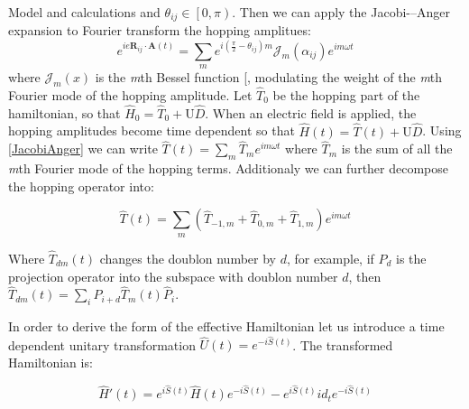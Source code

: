 \documentclass[aps,prl,twocolumn,amsmath,amssymb,superscriptaddress,nobibnotes]{revtex4-1}%
\renewcommand{\cite}[1]{{[}\onlinecite{#1}{]}}
\newcommand{\bs}{\boldsymbol}
\begin{document}
\begin{section}{Model and calculations}
and $\theta_{ij} \in \left[0,\pi\right)$. Then we can apply the Jacobi-–Anger expansion to Fourier transform the hopping amplitues:
\begin{equation}
\label{JacobiAnger}
e^{ie\bs{R}_{ij}\cdot\bs{A}(t)} = \sum_m e^{i(\frac{\pi}{2}-\theta_{ij})m} \mathcal{J}_m(\alpha_{ij}) e^{im\omega t} 
\end{equation}
where $\mathcal{J}_m(x)$ is the \textit{m}th Bessel function \cite{Kitamura2017}, modulating the weight of the \textit{m}th Fourier mode of the hopping amplitude. Let $\hat{T}_0$ be the hopping part of the hamiltonian, so that $\hat{H}_0 = \hat{T}_0 + \text{U}\hat{D}$. When an electric field is applied, the hopping amplitudes become time dependent so that $\hat{H}(t) = \hat{T}(t) +  \text{U}\hat{D}$. Using \ref{JacobiAnger} we can write $\hat{T}(t) = \sum_m \hat{T}_m e^{im \omega t}$ where $\hat{T}_m$ is the sum of all the \textit{m}th Fourier mode of the hopping terms. Additionaly we can further decompose the hopping operator into:

\begin{equation}
\hat{T}(t) = \sum_m (\hat{T}_{-1,m}+\hat{T}_{0,m}+\hat{T}_{1,m})e^{im\omega t}
\end{equation}

Where $\hat{T}_{dm}(t)$ changes the doublon number by $d$, for example, if $\hat{P}_d$ is the projection operator into the subspace with doublon number $d$, then $\hat{T}_{dm}(t) = \sum_i \hat{P}_{i+d}\hat{T}_{m}(t)\hat{P}_i$.

In order to derive the form of the effective Hamiltonian let us introduce a time dependent unitary transformation $\hat{U}(t) = e^{-i\hat{S}(t)}$. The transformed Hamiltonian is:

\begin{equation}
\hat{H}'(t) = e^{i\hat{S}(t)} \hat{H}(t) e^{-i\hat{S}(t)} - e^{i\hat{S}(t)} id_t e^{-i\hat{S}(t)}
\label{Htransformed}
\end{equation} 


\end{section}
\end{document}
